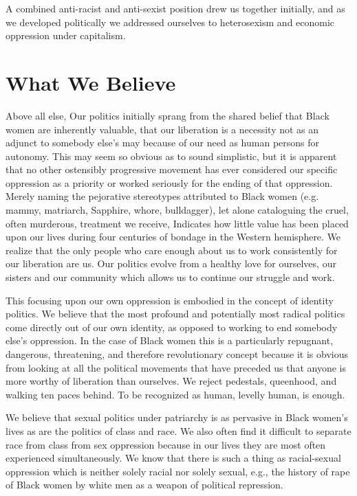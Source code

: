 \documentclass{article}
\begin{document}
A combined anti-racist and anti-sexist position drew us together initially, and
as we developed politically we addressed ourselves to heterosexism and economic
oppression under capitalism.

\section{What We Believe}

Above all else, Our politics initially sprang from the shared belief that Black
women are inherently valuable, that our liberation is a necessity not as an
adjunct to somebody else's may because of our need as human persons for
autonomy. This may seem so obvious as to sound simplistic, but it is apparent
that no other ostensibly progressive movement has ever considered our specific
oppression as a priority or worked seriously for the ending of that oppression.
Merely naming the pejorative stereotypes attributed to Black women (e.g. mammy,
matriarch, Sapphire, whore, bulldagger), let alone cataloguing the cruel, often
murderous, treatment we receive, Indicates how little value has been placed
upon our lives during four centuries of bondage in the Western hemisphere. We
realize that the only people who care enough about us to work consistently for
our liberation are us. Our politics evolve from a healthy love for ourselves,
our sisters and our community which allows us to continue our struggle and
work.

This focusing upon our own oppression is embodied in the concept of identity
politics. We believe that the most profound and potentially most radical
politics come directly out of our own identity, as opposed to working to end
somebody else's oppression. In the case of Black women this is a particularly
repugnant, dangerous, threatening, and therefore revolutionary concept because
it is obvious from looking at all the political movements that have preceded us
that anyone is more worthy of liberation than ourselves. We reject pedestals,
queenhood, and walking ten paces behind. To be recognized as human, levelly
human, is enough.

We believe that sexual politics under patriarchy is as pervasive in Black
women's lives as are the politics of class and race. We also often find it
difficult to separate race from class from sex oppression because in our lives
they are most often experienced simultaneously. We know that there is such a
thing as racial-sexual oppression which is neither solely racial nor solely
sexual, e.g., the history of rape of Black women by white men as a weapon of
political repression.
\end{document}
